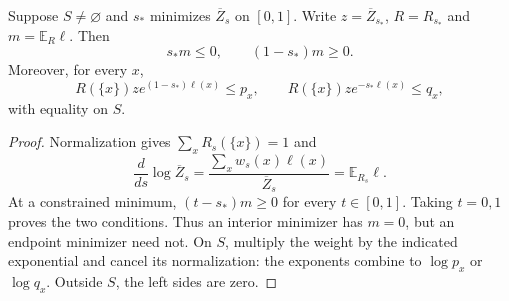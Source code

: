 \begin{lemma}
\label{lem:chernoff-tilt-conditions}
Suppose $S\ne\varnothing$ and $s_*$ minimizes $\overline Z_s$
on $[0,1]$. Write $z=\overline Z_{s_*}$, $R=R_{s_*}$ and
$m=\mathbb E_R\ell$. Then
\[
 s_*m\le0,\qquad (1-s_*)m\ge0.
\]
Moreover, for every $x$,
\[
 R(\{x\})z e^{(1-s_*)\ell(x)}\le p_x,
 \qquad
 R(\{x\})z e^{-s_*\ell(x)}\le q_x,
\]
with equality on $S$.
\end{lemma}
\begin{proof}
Normalization gives $\sum_xR_s(\{x\})=1$ and
\[
 \frac{d}{ds}\log\overline Z_s
 =\frac{\sum_xw_s(x)\ell(x)}{\overline Z_s}
 =\mathbb E_{R_s}\ell.
\]
At a constrained minimum, $(t-s_*)m\ge0$ for every $t\in[0,1]$.
Taking $t=0,1$ proves the two conditions. Thus an interior
minimizer has $m=0$, but an endpoint minimizer need not.
On $S$, multiply the weight by the indicated exponential and
cancel its normalization: the exponents combine to $\log p_x$
or $\log q_x$. Outside $S$, the left sides are zero.
\end{proof}
